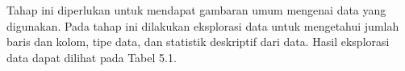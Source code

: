 Tahap ini diperlukan untuk mendapat gambaran umum mengenai data yang digunakan. Pada tahap ini dilakukan eksplorasi data untuk mengetahui jumlah baris dan kolom, tipe data, dan statistik deskriptif dari data. Hasil eksplorasi data dapat dilihat pada Tabel 5.1.
